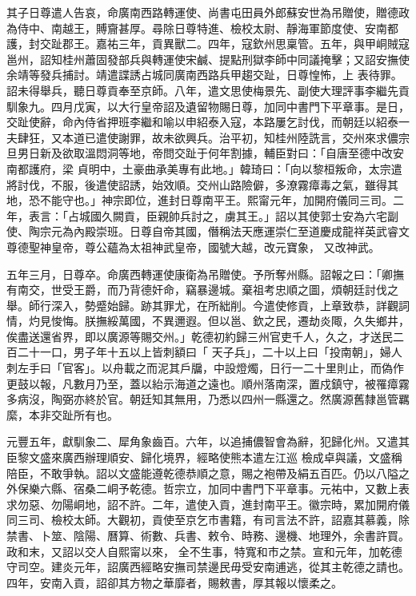 \begin{pinyinscope}
 其子日尊遣人告哀，命廣南西路轉運使、尚書屯田員外郎蘇安世為吊贈使，贈德政為侍中、南越王，賻齎甚厚。尋除日尊特進、檢校太尉、靜海軍節度使、安南都護，封交趾郡王。嘉祐三年，貢異獸二。四年，寇欽州思稟管。五年，與甲峒賊寇邕州，詔知桂州蕭固發部兵與轉運使宋鹹、提點刑獄李師中同議掩擊；又詔安撫使余靖等發兵捕討。靖遣諜誘占城同廣南西路兵甲趨交趾，日尊惶怖，上
 表待罪。詔未得舉兵，聽日尊貢奉至京師。八年，遣文思使梅景先、副使大理評事李繼先貢馴象九。四月戊寅，以大行皇帝詔及遺留物賜日尊，加同中書門下平章事。是日，交趾使辭，命內侍省押班李繼和喻以申紹泰入寇，本路屢乞討伐，而朝廷以紹泰一夫肆狂，又本道已遣使謝罪，故未欲興兵。治平初，知桂州陸詵言，交州來求儂宗旦男日新及欲取溫悶洞等地，帝問交趾于何年割據，輔臣對曰：「自唐至德中改安南都護府，梁
 貞明中，土豪曲承美專有此地。」韓琦曰：「向以黎桓叛命，太宗遣將討伐，不服，後遣使詔誘，始效順。交州山路險僻，多潦霧瘴毒之氣，雖得其地，恐不能守也。」神宗即位，進封日尊南平王。熙甯元年，加開府儀同三司。二年，表言：「占城國久闕貢，臣親帥兵討之，虜其王。」詔以其使郭士安為六宅副使、陶宗元為內殿崇班。日尊自帝其國，僭稱法天應運崇仁至道慶成龍祥英武睿文尊德聖神皇帝，尊公蘊為太祖神武皇帝，國號大越，改元寶象，
 又改神武。



 五年三月，日尊卒。命廣西轉運使康衛為吊贈使。予所奪州縣。詔報之曰：「卿撫有南交，世受王爵，而乃背德奸命，竊暴邊城。棄祖考忠順之圖，煩朝廷討伐之舉。師行深入，勢蹙始歸。跡其罪尤，在所絀削。今遣使修貢，上章致恭，詳觀詞情，灼見悛悔。朕撫綏萬國，不異邇遐。但以邕、欽之民，遷劫炎陬，久失鄉井，俟盡送還省界，即以廣源等賜交州。」乾德初約歸三州官吏千人，久之，才送民二百二十一口，男子年十五以上皆刺額曰「
 天子兵」，二十以上曰「投南朝」，婦人刺左手曰「官客」。以舟載之而泥其戶牖，中設燈燭，日行一二十里則止，而偽作更鼓以報，凡數月乃至，蓋以紿示海道之遠也。順州落南深，置戍鎮守，被罹瘴霧多病沒，陶弼亦終於官。朝廷知其無用，乃悉以四州一縣還之。然廣源舊隸邕管羈縻，本非交趾所有也。



 元豐五年，獻馴象二、犀角象齒百。六年，以追捕儂智會為辭，犯歸化州。又遣其臣黎文盛來廣西辦理順安、歸化境界，經略使熊本遣左江巡
 檢成卓與議，文盛稱陪臣，不敢爭執。詔以文盛能遵乾德恭順之意，賜之袍帶及絹五百匹。仍以八隘之外保樂六縣、宿桑二峒予乾德。哲宗立，加同中書門下平章事。元祐中，又數上表求勿惡、勿陽峒地，詔不許。二年，遣使入貢，進封南平王。徽宗時，累加開府儀同三司、檢校太師。大觀初，貢使至京乞市書籍，有司言法不許，詔嘉其慕義，除禁書、卜筮、陰陽、曆算、術數、兵書、敕令、時務、邊機、地理外，余書許買。政和末，又詔以交人自熙甯以來，
 全不生事，特寬和市之禁。宣和元年，加乾德守司空。建炎元年，詔廣西經略安撫司禁邊民毋受安南逋逃，從其主乾德之請也。四年，安南入貢，詔卻其方物之華靡者，賜敕書，厚其報以懷柔之。




\end{pinyinscope}
